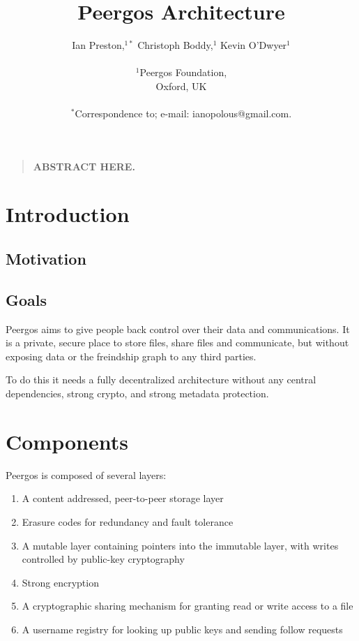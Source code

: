 \documentclass[12pt]{article}
\title{Peergos Architecture}
\author
{Ian Preston,$^{1\ast}$ Christoph Boddy,$^{1}$ Kevin O'Dwyer$^{1}$\\
\\
\normalsize{$^{1}$Peergos Foundation,}\\
\normalsize{Oxford, UK}\\
\\
\normalsize{$^\ast$Correspondence to; e-mail:  ianopolous@gmail.com.}
}
\date{}
\newenvironment{sciabstract}{%
\begin{quote} \bf}
{\end{quote}}
\begin{document}
 


\baselineskip24pt


\maketitle 




\begin{sciabstract}
        ABSTRACT  HERE.
\end{sciabstract}


\section*{Introduction}

\subsection*{Motivation}


\subsection*{Goals}
Peergos aims to give people back control over their data and communications. It is a private, secure place to store files, share files and communicate, but without exposing data or the freindship graph to any third parties. 

To do this it needs a fully decentralized architecture without any central dependencies, strong crypto, and strong metadata protection. 

\section*{Components}
Peergos is composed of several layers:

\begin{enumerate}
\item A content addressed, peer-to-peer storage layer
\item Erasure codes for redundancy and fault tolerance
\item A mutable layer containing pointers into the immutable layer, with writes controlled by public-key cryptography
\item Strong encryption
\item A cryptographic sharing mechanism for granting read or write access to a file
\item A username registry for looking up public keys and sending follow requests
\end{enumerate}
\end{document}
